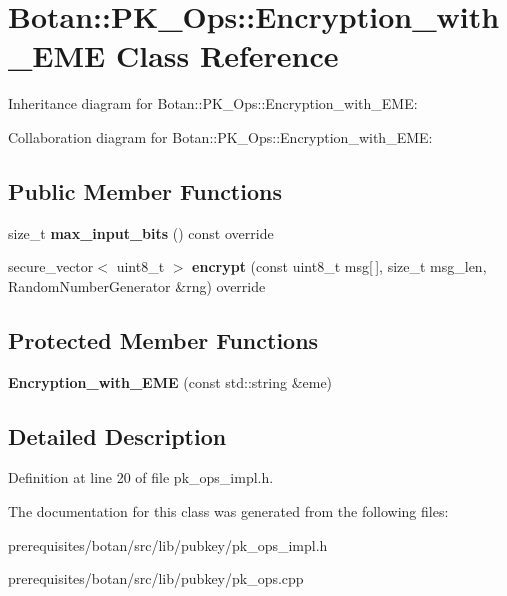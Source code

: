 \hypertarget{class_botan_1_1_p_k___ops_1_1_encryption__with___e_m_e}{}\section{Botan\+:\+:P\+K\+\_\+\+Ops\+:\+:Encryption\+\_\+with\+\_\+\+E\+ME Class Reference}
\label{class_botan_1_1_p_k___ops_1_1_encryption__with___e_m_e}


Inheritance diagram for Botan\+:\+:P\+K\+\_\+\+Ops\+:\+:Encryption\+\_\+with\+\_\+\+E\+ME\+:


Collaboration diagram for Botan\+:\+:P\+K\+\_\+\+Ops\+:\+:Encryption\+\_\+with\+\_\+\+E\+ME\+:
\subsection*{Public Member Functions}
\begin{DoxyCompactItemize}
\item 
\mbox{\label{class_botan_1_1_p_k___ops_1_1_encryption__with___e_m_e_a9e2f72b7671ba1857672dcc8bd7a1099}} 
size\+\_\+t {\bfseries max\+\_\+input\+\_\+bits} () const override
\item 
\mbox{\label{class_botan_1_1_p_k___ops_1_1_encryption__with___e_m_e_abd849a7046ea3694bb0dfcb4520e70b7}} 
secure\+\_\+vector$<$ uint8\+\_\+t $>$ {\bfseries encrypt} (const uint8\+\_\+t msg\mbox{[}$\,$\mbox{]}, size\+\_\+t msg\+\_\+len, Random\+Number\+Generator \&rng) override
\end{DoxyCompactItemize}
\subsection*{Protected Member Functions}
\begin{DoxyCompactItemize}
\item 
\mbox{\label{class_botan_1_1_p_k___ops_1_1_encryption__with___e_m_e_ad18abcb767bcd1f42b10aff42e3bb579}} 
{\bfseries Encryption\+\_\+with\+\_\+\+E\+ME} (const std\+::string \&eme)
\end{DoxyCompactItemize}


\subsection{Detailed Description}


Definition at line 20 of file pk\+\_\+ops\+\_\+impl.\+h.



The documentation for this class was generated from the following files\+:\begin{DoxyCompactItemize}
\item 
prerequisites/botan/src/lib/pubkey/pk\+\_\+ops\+\_\+impl.\+h\item 
prerequisites/botan/src/lib/pubkey/pk\+\_\+ops.\+cpp\end{DoxyCompactItemize}
